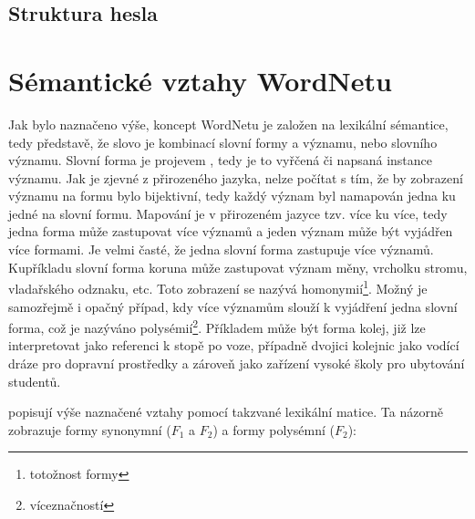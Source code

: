 \documentclass[a4paper, 11pt, oneside]{book}
\newcommand{\td}[2][]{
	{\todo[size=\footnotesize]{#2}}
}
\newcommand\ex{\textsf}
\begin{document}
			

			\subsection{Struktura hesla}

		


		\section{Sémantické vztahy WordNetu}
		\label{cha:sem-vztahy}

			Jak bylo naznačeno výše, koncept WordNetu je založen na lexikální sémantice, tedy představě, že slovo je kombinací slovní formy a významu, nebo slovního významu. Slovní forma je projevem , tedy je to vyřčená či napsaná instance významu. Jak je zjevné z přirozeného jazyka, nelze počítat s tím, že by zobrazení významu na formu bylo bijektivní, tedy každý význam byl namapován jedna ku jedné na slovní formu. Mapování je v přirozeném jazyce tzv. více ku více, tedy jedna forma může zastupovat více významů a jeden význam může být vyjádřen více formami. Je velmi časté, že jedna slovní forma zastupuje více významů. Kupříkladu slovní forma \ex{koruna} může zastupovat význam měny, vrcholku stromu, vladařského odznaku, etc. Toto zobrazení se nazývá homonymií\footnote{totožnost formy}. Možný je samozřejmě i opačný případ, kdy více významům slouží k vyjádření jedna slovní forma, což je nazýváno polysémií\footnote{víceznačností}. Příkladem může být forma \ex{kolej}, již lze interpretovat jako referenci k stopě po voze, případně dvojici kolejnic jako vodící dráze pro dopravní prostředky\td{cit. SSJC} a zároveň jako zařízení vysoké školy pro ubytování studentů.\td{cit SSJC}

			\textcite{miller1990introduction} popisují výše naznačené vztahy pomocí takzvané lexikální matice. Ta názorně zobrazuje formy synonymní ($F_1$ a $F_2$) a formy polysémní ($F_2$):
\end{document}
